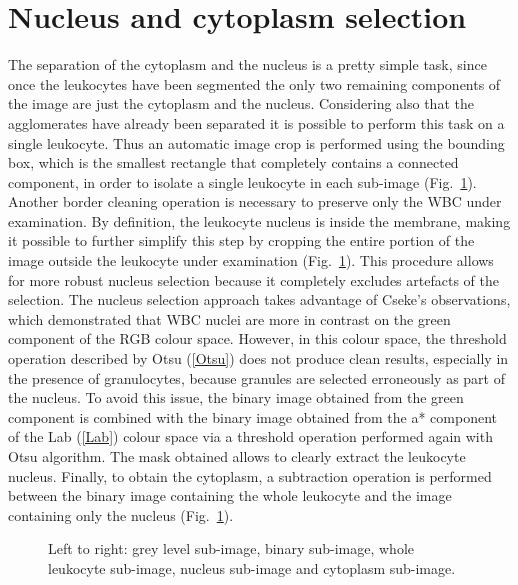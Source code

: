 \documentclass[final,a4paper,12pt,english]{UnicaPhdThesis3}
\begin{document}
\section{Nucleus and cytoplasm selection}
The separation of the cytoplasm and the nucleus is a pretty simple task, since once the leukocytes have been segmented the only two remaining components of the image are just the cytoplasm and the nucleus. Considering also that the agglomerates have already been separated it is possible to perform this task on a single leukocyte. Thus an automatic image crop is performed using the bounding box, which is the smallest rectangle that completely contains a connected component, in order to isolate a single leukocyte in each sub-image (Fig.~\ref{fig:example14}). Another border cleaning operation  is necessary to preserve only the WBC under examination. By definition,  the leukocyte nucleus is inside the  membrane,  making it possible to further simplify this step by cropping the entire portion  of the image outside the leukocyte under examination (Fig.~\ref{fig:example14}). This procedure allows for more robust nucleus selection because it completely excludes artefacts of the selection. The nucleus selection approach takes advantage  of Cseke's \cite{Cseke} observations, which demonstrated that WBC nuclei are more in contrast on the green component of the RGB colour space. However, in this colour space, the threshold operation described by Otsu (\ref{Otsu}) does not produce clean results, especially in the presence of granulocytes, because granules are selected erroneously as part  of the  nucleus. To avoid this issue, the binary image obtained from the green component is combined with the binary image obtained from the a* component of the Lab (\ref{Lab}) colour space via a threshold operation performed again with Otsu algorithm. The mask obtained allows to clearly extract the leukocyte nucleus. Finally, to obtain the cytoplasm, a subtraction operation is performed between the binary image containing  the whole leukocyte and the image containing only the nucleus (Fig.~\ref{fig:example14}).

\begin{figure}[!htbp]
\centering
\caption{\label{fig:example14}Left to right: grey level sub-image, binary sub-image, whole leukocyte sub-image, nucleus sub-image and cytoplasm sub-image.}
\end{figure}
\end{document}

